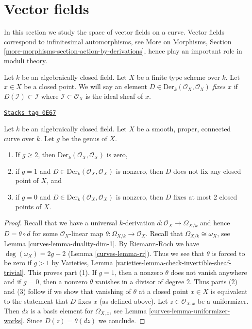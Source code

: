 \section{Vector fields}
\label{curves-section-vector-fields}
In this section we study the space of vector fields on a curve.
Vector fields correspond to infinitesimal automorphisms, see
More on Morphisms, Section \ref{more-morphisms-section-action-by-derivations},
hence play an important role in moduli theory.

\medskip\noindent
Let $k$ be an algebraically closed field.
Let $X$ be a finite type scheme over $k$.
Let $x \in X$ be a closed point.
We will say an element $D \in \text{Der}_k(\mathcal{O}_X, \mathcal{O}_X)$
{\it fixes $x$} if $D(\mathcal{I}) \subset \mathcal{I}$ where
$\mathcal{I} \subset \mathcal{O}_X$ is the ideal sheaf of $x$.

\begin{lemma}
\label{curves-lemma-smooth-vector-fields}
\href{https://stacks.math.columbia.edu/tag/0E67}{\texttt{Stacks tag 0E67}}

Let $k$ be an algebraically closed field.
Let $X$ be a smooth, proper, connected curve over $k$.
Let $g$ be the genus of $X$.
\begin{enumerate}
\item If $g \geq 2$, then $\text{Der}_k(\mathcal{O}_X, \mathcal{O}_X)$
is zero,
\item if $g = 1$ and $D \in \text{Der}_k(\mathcal{O}_X, \mathcal{O}_X)$
is nonzero, then $D$ does not fix any closed point of $X$, and
\item if $g = 0$ and $D \in \text{Der}_k(\mathcal{O}_X, \mathcal{O}_X)$
is nonzero, then $D$ fixes at most $2$ closed points of $X$.
\end{enumerate}
\end{lemma}

\begin{proof}

Recall that we have a universal $k$-derivation
$d : \mathcal{O}_X \to \Omega_{X/k}$ and hence $D = \theta \circ d$
for some $\mathcal{O}_X$-linear map $\theta : \Omega_{X/k} \to \mathcal{O}_X$.
Recall that $\Omega_{X/k} \cong \omega_X$, see
Lemma \ref{curves-lemma-duality-dim-1}.
By Riemann-Roch we have $\deg(\omega_X) = 2g - 2$
(Lemma \ref{curves-lemma-rr}).
Thus we see that $\theta$ is forced to be zero
if $g > 1$ by Varieties, Lemma
\ref{varieties-lemma-check-invertible-sheaf-trivial}.
This proves part (1).
If $g = 1$, then a nonzero $\theta$ does not vanish anywhere and if
$g = 0$, then a nonzero $\theta$ vanishes in a divisor of degree $2$.
Thus parts (2) and (3) follow if we show that
vanishing of $\theta$ at a closed point $x \in X$ is
equivalent to the statement that $D$ fixes $x$ (as defined above).
Let $z \in \mathcal{O}_{X, x}$ be a uniformizer.
Then $dz$ is a basis element for $\Omega_{X, x}$, see
Lemma \ref{curves-lemma-uniformizer-works}.
Since $D(z) = \theta(dz)$ we conclude.
\end{proof}

